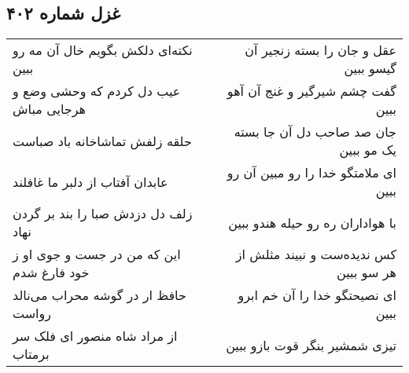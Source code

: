 \begin{center}
\section*{غزل شماره ۴۰۲}
\label{sec:sh402}
\begin{longtable}{l p{0.5cm} r}
نکته‌ای دلکش بگویم خال آن مه رو ببین
&&
عقل و جان را بسته زنجیر آن گیسو ببین
\\
عیب دل کردم که وحشی وضع و هرجایی مباش
&&
گفت چشم شیرگیر و غنج آن آهو ببین
\\
حلقه زلفش تماشاخانه باد صباست
&&
جان صد صاحب دل آن جا بسته یک مو ببین
\\
عابدان آفتاب از دلبر ما غافلند
&&
ای ملامتگو خدا را رو مبین آن رو ببین
\\
زلف دل دزدش صبا را بند بر گردن نهاد
&&
با هواداران ره رو حیله هندو ببین
\\
این که من در جست و جوی او ز خود فارغ شدم
&&
کس ندیده‌ست و نبیند مثلش از هر سو ببین
\\
حافظ ار در گوشه محراب می‌نالد رواست
&&
ای نصیحتگو خدا را آن خم ابرو ببین
\\
از مراد شاه منصور ای فلک سر برمتاب
&&
تیزی شمشیر بنگر قوت بازو ببین
\\
\end{longtable}
\end{center}
